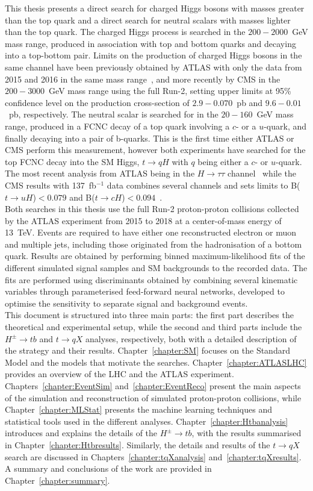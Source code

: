 This thesis presents a direct search for charged Higgs bosons with masses greater than the top quark and a direct search for neutral scalars with masses lighter than the top quark. The charged Higgs process is searched in the $200-2000$~GeV mass range, produced in association with top and bottom quarks and decaying into a top-bottom pair. Limits on the production of charged Higgs bosons in the same channel have been previously obtained by ATLAS with only the data from 2015 and 2016 in the same mass range~\cite{ATLASHptb2018}, and more recently by CMS in the $200-3000$~GeV mass range using the full Run-2, setting upper limits at 95\% confidence level on the production cross-section of $2.9-0.070$~pb and $9.6-0.01$~pb, respectively. The neutral scalar is searched for in the $20-160$~GeV mass range, produced in a FCNC decay of a top quark involving a $c$- or a $u$-quark, and finally decaying into a pair of b-quarks. This is the first time either ATLAS or CMS perform this measurement, however both experiments have searched for the top FCNC decay into the SM Higgs, $t\to qH$ with $q$ being either a $c$- or $u$-quark. The most recent analysis from ATLAS being in the $H\to\tau\tau$ channel~\cite{ATLAStqHtautau} while the CMS results with 137~fb$^{-1}$ data combines several channels and sets limits to B($t\to uH$)$ < 0.079$ and B($t\to cH$)$ < 0.094$~\cite{CMStqHRun2}.\\

Both searches in this thesis use the full Run-2 proton-proton collisions collected by the ATLAS experiment from 2015 to 2018 at a center-of-mass energy of 13~TeV. Events are required to have either one reconstructed electron or muon and multiple jets, including those originated from the hadronisation of a bottom quark. Results are obtained by performing binned maximum-likelihood fits of the different simulated signal samples and SM backgrounds to the recorded data. The fits are performed using discriminants obtained by combining several kinematic variables through parameterised feed-forward neural networks, developed to optimise the sensitivity to separate signal and background events.\\

This document is structured into three main parts: the first part describes the theoretical and experimental setup, while the second and third parts include the $H^\pm\to tb$ and $t\to qX$ analyses, respectively, both with a detailed description of the strategy and their results. Chapter~\ref{chapter:SM} focuses on the Standard Model and the models that motivate the searches. Chapter~\ref{chapter:ATLASLHC} provides an overview of the LHC and the ATLAS experiment. Chapters~\ref{chapter:EventSim} and~\ref{chapter:EventReco} present the main aspects of the simulation and reconstruction of simulated proton-proton collisions, while Chapter~\ref{chapter:MLStat} presents the machine learning techniques and statistical tools used in the different analyses. Chapter~\ref{chapter:Htbanalysis} introduces and explains the details of the $H^\pm\to tb$, with the results summarised in Chapter~\ref{chapter:Htbresults}. Similarly, the details and results of the $t\to qX$ search are discussed in Chapters~\ref{chapter:tqXanalysis} and~\ref{chapter:tqXresults}. A summary and conclusions of the work are provided in Chapter~\ref{chapter:summary}.